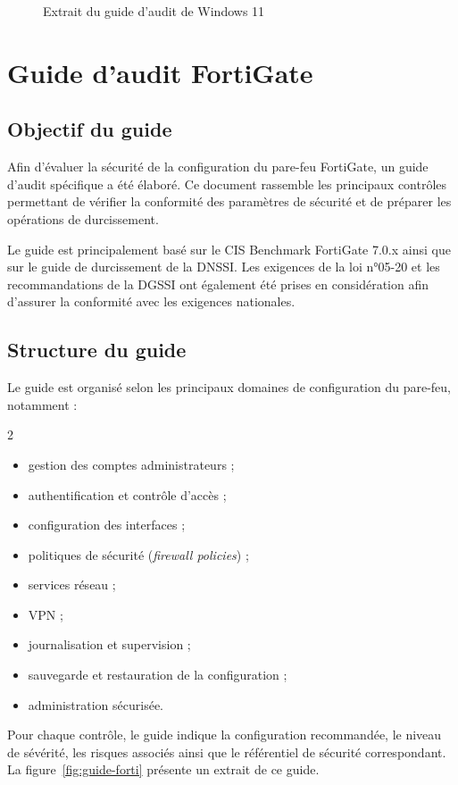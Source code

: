 \begin{figure}[htbp]
\centering
{}
\caption{Extrait du guide d'audit de Windows 11}
\label{fig:guide-win}
\end{figure}

\section{Guide d'audit FortiGate}

\subsection{Objectif du guide}

Afin d'évaluer la sécurité de la configuration du pare-feu FortiGate, un guide d'audit spécifique a été élaboré. Ce document rassemble les principaux contrôles permettant de vérifier la conformité des paramètres de sécurité et de préparer les opérations de durcissement.

Le guide est principalement basé sur le CIS Benchmark FortiGate 7.0.x ainsi que sur le guide de durcissement de la DNSSI. Les exigences de la loi n°05-20 et les recommandations de la DGSSI ont également été prises en considération afin d'assurer la conformité avec les exigences nationales.

\subsection{Structure du guide}

Le guide est organisé selon les principaux domaines de configuration du pare-feu, notamment :
\begin{multicols}{2}
\begin{itemize}
  \item gestion des comptes administrateurs ;
  \item authentification et contrôle d'accès ;
  \item configuration des interfaces ;
  \item politiques de sécurité (\emph{firewall policies}) ;
  \item services réseau ;
  \item VPN ;
  \item journalisation et supervision ;
  \item sauvegarde et restauration de la configuration ;
  \item administration sécurisée.
\end{itemize}
\end{multicols}
Pour chaque contrôle, le guide indique la configuration recommandée, le niveau de sévérité, les risques associés ainsi que le référentiel de sécurité correspondant. La figure~\ref{fig:guide-forti} présente un extrait de ce guide.

